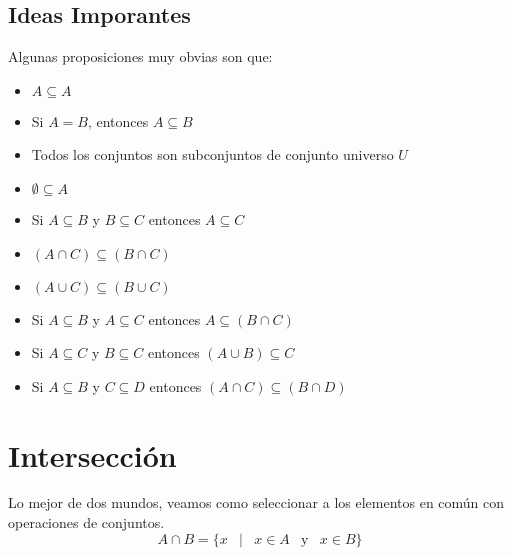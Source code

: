 \documentclass[12pt, fleqn]{report}                             %
\DeclareMathOperator \Space {\quad}                             %
\DeclareMathOperator \MiniSpace {\;}                            %
\newcommand \Such {\MiniSpace|\MiniSpace}                       %
\newcommand \Also {\MiniSpace \text{y} \MiniSpace}              %
\begin{document}
            \subsection{Ideas Imporantes}

                Algunas proposiciones muy obvias son que:
                \begin{itemize}
                    \item $A \subseteq A$
                    \item Si $A = B$, entonces $A \subseteq B$
                    \item Todos los conjuntos son subconjuntos de conjunto universo $U$
                    \item $\emptyset \subseteq A$
                    \item Si $A \subseteq B$ y $B \subseteq C$ entonces $A \subseteq C$
                    \item $(A \cap C) \subseteq (B \cap C)$
                    \item $(A \cup C) \subseteq (B \cup C)$
                    \item Si $A \subseteq B$ y $A \subseteq C$ entonces $A \subseteq (B \cap C)$
                    \item Si $A \subseteq C$ y $B \subseteq C$ entonces $(A \cup B) \subseteq C$
                    \item Si $A \subseteq B$ y $C \subseteq D$ entonces $(A \cap C) \subseteq (B \cap D)$
                \end{itemize}









        \clearpage
        \section{Intersección}

            Lo mejor de dos mundos, veamos como seleccionar a los elementos en común con operaciones
            de conjuntos.
            \begin{equation*}
                A \cap B = \{ x \Such x \in A \Also x \in B \}
            \end{equation*}
\end{document}
